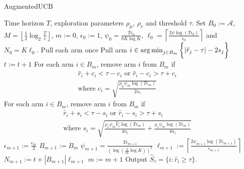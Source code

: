 \begin{algorithm}[t!]
\caption{AugmentedUCB}
\label{alg:augucb}
\begin{algorithmic}
 Time horizon $T$, exploration parameters $\rho_{\mu}$, $\rho_v$ and threshold $\tau$.
 Set $B_{0}:=\mathcal{A}$, $M=\left\lfloor \frac{1}{2}\log_{2} \frac{T}{e}\right\rfloor $, $m:=0$, $\epsilon_{0}:=1$, $\psi_{0}=\frac{T\epsilon_{0}}{8K\log K}$, $\ell_{0}=\left\lceil \frac{2\psi\log( T\epsilon_{0})}{\epsilon_{0}} \right\rceil$ and $N_{0}=K\ell_{0} $.
\State Pull each arm once
\State {}
\State Pull arm $i\in\operatorname*{arg\,min}_{j\in B_{m}}\bigg\lbrace |\hat{r}_{j} - \tau | - 2s_{j}\bigg\rbrace$
\State $t:=t+1$ 
\ArmElim
\State For each arm $i \in B_{m}$, remove arm ${i}$ from $B_{m}$ if
\begin{align*}
\hat{r}_{i} + c_i  < \tau - c_i \mbox{ or } \hat{r}_{i} - c_i  > \tau + c_i \\
\text{where $c_i=\sqrt{\frac{\rho_{\mu}\psi_{m}\log{( T\epsilon_{m})}}{2 n_{i}}}$}
\end{align*}
\EndArmElim
\ArmElimV
\State For each arm $i \in B_{m}$, remove arm ${i}$ from $B_{m}$ if
\begin{align*}
\hat{r}_{i} + s_i  < \tau - s_i \mbox{ or } \hat{r}_{i} - s_i  > \tau + s_i \\
\text{where $s_i=\sqrt{\frac{\rho_v\psi_{m}\hat{V}_{i}\log{( T\epsilon_{m})}}{4 n_{i}} + \frac{\rho_v\psi_{m} \log{(T\epsilon_{m})}}{4 n_{i}}}$}
\end{align*}
\EndArmElimV
\State {}
\ResetParam
\State $\epsilon_{m+1}:=\frac{\epsilon_{m}}{2}$
\State $B_{m+1} := B_{m}$
\State $\psi_{m+1}=\frac{T\epsilon_{m+1}}{(\log(\frac{3}{16}\log K))^{2}}$
\State $\ell_{m+1}:=\left\lceil \frac{2\psi_{m+1}\log( T\epsilon_{m+1})}{\epsilon_{m+1}} \right\rceil$
\State $N_{m+1} := t + |B_{m+1}|\ell_{m+1}$
\State $m := m+1$
\EndResetParam
\EndIf
\EndFor
\State Output $\hat{S}_{\tau}=\lbrace i: \hat{r}_{i}\geq \tau \rbrace$.
\end{algorithmic}
\end{algorithm}


